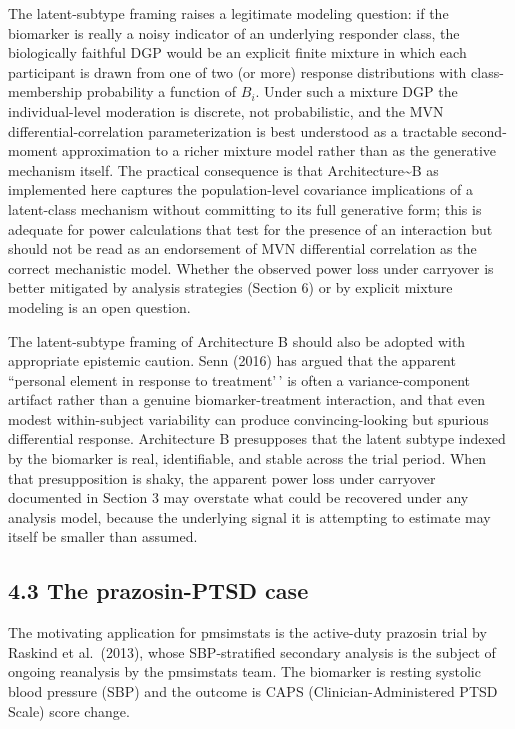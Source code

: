 \documentclass[
]{article}
\begin{document}
The latent-subtype framing raises a legitimate modeling
question: if the biomarker is really a noisy indicator of an
underlying responder class, the biologically faithful DGP would
be an explicit finite mixture in which each participant is drawn
from one of two (or more) response distributions with
class-membership probability a function of \(B_i\). Under such a
mixture DGP the individual-level moderation is discrete, not
probabilistic, and the MVN differential-correlation
parameterization is best understood as a tractable
second-moment approximation to a richer mixture model rather
than as the generative mechanism itself. The practical
consequence is that Architecture\textasciitilde B as implemented here captures
the population-level covariance implications of a latent-class
mechanism without committing to its full generative form; this
is adequate for power calculations that test for the presence
of an interaction but should not be read as an endorsement of
MVN differential correlation as the correct mechanistic model.
Whether the observed power loss under carryover is better
mitigated by analysis strategies (Section 6) or by explicit
mixture modeling is an open question.

The latent-subtype framing of Architecture B should also be
adopted with appropriate epistemic caution. Senn (2016) has
argued that
the apparent ``personal element in response to treatment'\,' is
often a variance-component artifact rather than a genuine
biomarker-treatment interaction, and that even modest
within-subject variability can produce convincing-looking but
spurious differential response. Architecture B presupposes that
the latent subtype indexed by the biomarker is real,
identifiable, and stable across the trial period. When that
presupposition is shaky, the apparent power loss under carryover
documented in Section 3 may overstate what could be recovered
under any analysis model, because the underlying signal it is
attempting to estimate may itself be smaller than assumed.

\subsection{4.3 The prazosin-PTSD case}

The motivating application for pmsimstats is the active-duty
prazosin trial by Raskind et al.~(2013), whose SBP-stratified
secondary analysis is the subject of ongoing reanalysis by the
pmsimstats team.
The biomarker is resting systolic blood pressure (SBP) and the
outcome is CAPS (Clinician-Administered PTSD Scale) score
change.
\end{document}
